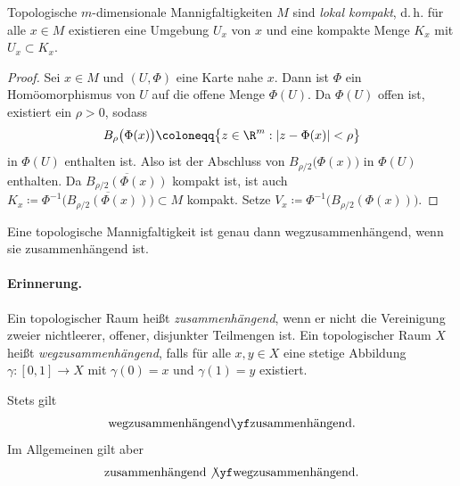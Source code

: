 \documentclass[11pt]{article}
\begin{document}
\begin{proposition}\Theorem
  Topologische $m$-dimensionale Mannigfaltigkeiten $M$ sind \emph{lokal kompakt}, d.\,h. für alle $x \in M$ existieren eine Umgebung $U_x$ von $x$ und eine kompakte Menge $K_x$ mit $U_x \subset K_x$.
\end{proposition}

\begin{proof}
  Sei $x \in M$ und $(U, \Phi)$ eine Karte nahe $x$. Dann ist $\Phi$ ein Homöomorphismus von $U$ auf die offene Menge $\Phi(U)$.
Da $\Phi(U)$ offen ist, existiert ein $\rho > 0$, sodass
  \[ B_\rho\bigl(\Phi(x)\bigr) \coloneqq \bigl\{ z \in \R^m : \lvert z - \Phi(x) \rvert < \rho \bigr\} \]
  in $\Phi(U)$ enthalten ist. Also ist der Abschluss von $B_{\rho/2}\bigl(\Phi(x)\bigr)$ in $\Phi(U)$ enthalten.
Da $\overline{B_{\rho/2}(\Phi(x))}$ kompakt ist, ist auch $K_x \coloneqq \Phi^{-1}\bigl(\overline{B_{\rho/2}(\Phi(x))}\bigr) \subset M$ kompakt.
  Setze $V_x \coloneqq \Phi^{-1}\bigl(B_{\rho/2}(\Phi(x))\bigr)$.
\end{proof}



\begin{proposition}[Zusammenhang]\Theorem
  Eine topologische Mannigfaltigkeit ist genau dann wegzusammenhängend, wenn sie zusammenhängend ist.
\end{proposition}


\paragraph{Erinnerung.}
Ein topologischer Raum heißt \emph{zusammenhängend}, wenn er nicht die Vereinigung zweier nichtleerer, offener, disjunkter Teilmengen ist.
Ein topologischer Raum $X$ heißt \emph{wegzusammenhängend}, falls für alle $x, y \in X$ eine stetige Abbildung $\gamma\colon [0, 1] \to X$ mit $\gamma(0) = x$ und $\gamma(1) = y$ existiert.

\begin{note}
  Stets gilt
  \[ \text{wegzusammenhängend} \yf \text{zusammenhängend}. \]
  Im Allgemeinen gilt aber
  \[ \text{zusammenhängend} \not\yf \text{wegzusammenhängend}. \]
\end{note}
\end{document}
